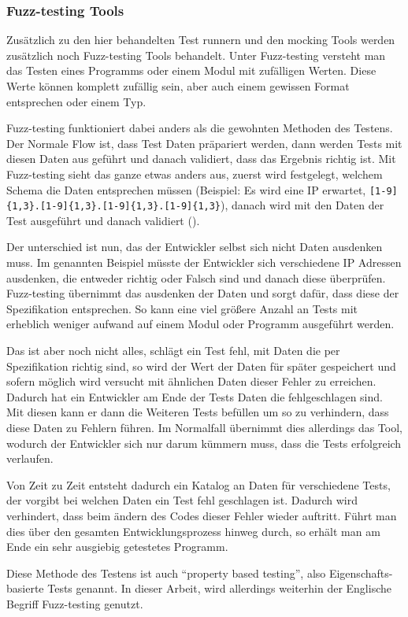 \subsubsection{Fuzz-testing Tools}\label{python-tools:extlib:fuzz}

Zusätzlich zu den hier behandelten Test runnern und den \gls{mock}ing Tools werden
zusätzlich noch Fuzz-testing Tools behandelt. Unter Fuzz-testing versteht man das
Testen eines Programms oder einem Modul mit zufälligen Werten. Diese Werte können
komplett zufällig sein, aber auch einem gewissen Format entsprechen oder einem Typ.

Fuzz-testing funktioniert dabei anders als die gewohnten Methoden des Testens. Der
Normale Flow ist, dass Test Daten präpariert werden, dann werden Tests mit diesen
Daten aus geführt und danach validiert, dass das Ergebnis richtig ist. Mit
Fuzz-testing sieht das ganze etwas anders aus, zuerst wird festgelegt, welchem
Schema die Daten entsprechen müssen (Beispiel: Es wird eine IP erwartet,
\lstinline|[1-9]{1,3}.[1-9]{1,3}.[1-9]{1,3}.[1-9]{1,3}|), danach wird mit den Daten
der Test ausgeführt und danach validiert (\cite{hypothesis:doc:4.18.0}).

Der unterschied ist nun, das der Entwickler selbst sich nicht Daten ausdenken muss.
Im genannten Beispiel müsste der Entwickler sich verschiedene IP Adressen ausdenken,
die entweder richtig oder Falsch sind und danach diese überprüfen. Fuzz-testing
übernimmt das ausdenken der Daten und sorgt dafür, dass diese der Spezifikation
entsprechen. So kann eine viel größere Anzahl an Tests mit erheblich weniger aufwand
auf einem Modul oder Programm ausgeführt werden.

Das ist aber noch nicht alles, schlägt ein Test fehl, mit Daten die per Spezifikation
richtig sind, so wird der Wert der Daten für später gespeichert und sofern möglich
wird versucht mit ähnlichen Daten dieser Fehler zu erreichen. Dadurch hat ein
Entwickler am Ende der Tests Daten die fehlgeschlagen sind. Mit diesen kann er dann
die Weiteren Tests befüllen um so zu verhindern, dass diese Daten zu Fehlern führen.
Im Normalfall übernimmt dies allerdings das Tool, wodurch der Entwickler sich nur
darum kümmern muss, dass die Tests erfolgreich verlaufen.

Von Zeit zu Zeit entsteht dadurch ein Katalog an Daten für verschiedene Tests, der
vorgibt bei welchen Daten ein Test fehl geschlagen ist. Dadurch wird verhindert,
dass beim ändern des Codes dieser Fehler wieder auftritt. Führt man dies über den
gesamten Entwicklungsprozess hinweg durch, so erhält man am Ende ein sehr ausgiebig
getestetes Programm.

Diese Methode des Testens ist auch "`property based testing"', also Eigenschafts-
basierte Tests genannt. In dieser Arbeit, wird allerdings weiterhin der Englische
Begriff Fuzz-testing genutzt.

